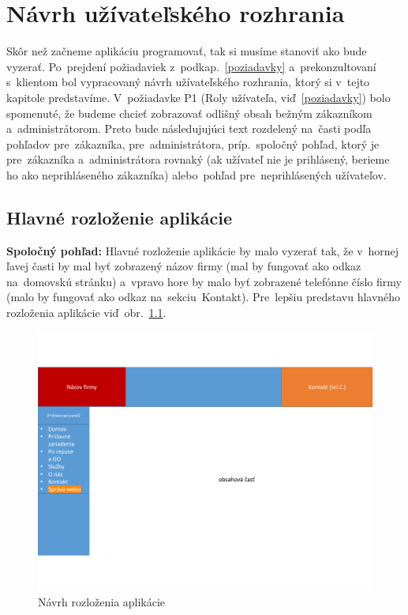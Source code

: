 \chapter{Návrh užívateľského rozhrania}
\label{navrh ui}

Skôr než začneme aplikáciu programovať, tak si musíme stanoviť ako bude vyzerať. Po~prejdení požiadaviek z~podkap.~\ref{poziadavky} a~prekonzultovaní s~klientom bol vypracovaný návrh užívateľského rozhrania, ktorý si v~tejto kapitole predstavíme. V~požiadavke P1 (Roly užívateľa, viď~\ref{poziadavky}) bolo spomenuté, že budeme chcieť zobrazovať odlišný obsah bežným zákazníkom a~administrátorom. Preto bude následujujúci text rozdelený na~časti podľa pohľadov pre~zákazníka, pre~administrátora, príp.~spoločný pohľad, ktorý je pre~zákazníka a~administrátora rovnaký (ak užívateľ nie je prihlásený, berieme ho ako neprihláseného zákazníka) alebo~pohľad pre~neprihlásených užívateľov.

\section{Hlavné rozloženie aplikácie}
\label{hlavne rozlozenie aplikacie}

\textbf{Spoločný pohľad:} Hlavné rozloženie aplikácie by malo vyzerať tak, že v~hornej ľavej časti by mal byť zobrazený názov firmy (mal by fungovať ako odkaz na~domovskú stránku) a~vpravo hore by malo byť zobrazené telefónne číslo firmy (malo by fungovať ako odkaz na~sekciu~Kontakt). Pre~lepšiu predstavu hlavného rozloženia aplikácie viď~obr.~\ref{layout}.

\begin{figure}[H]\centering
\includegraphics[width=140mm]{../img/UI concept/layout}
\caption{Návrh rozloženia aplikácie}
\label{layout}
\end{figure}

